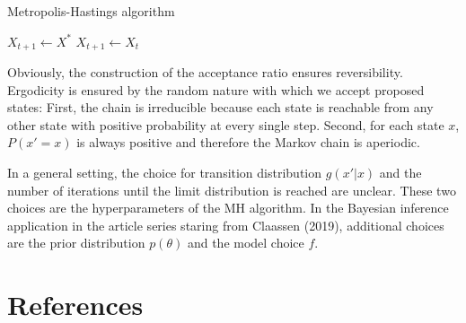 \documentclass[12pt,english,a4paper,oneside]{article}
\theoremstyle{definition}
\theoremstyle{definition}
\theoremstyle{definition}
\theoremstyle{definition}
\theoremstyle{remark}
\begin{document}
\begin{algorithm}[H]
\caption{Metropolis-Hastings algorithm}
\begin{algorithmic}

              \State $X_{t+1} \gets X^*$
          \Else
              \State $X_{t+1} \gets X_t$
\EndIf 
        \EndFor   
\end{algorithmic}
\end{algorithm}

\noindent
Obviously, the construction of the acceptance ratio ensures reversibility. Ergodicity is ensured by the random nature with which we accept proposed states: First, the chain is irreducible because each state is reachable from any other state with positive probability at every single step. Second, for each state \(x\), \(P(x'=x)\) is always positive and therefore the Markov chain is aperiodic.

In a general setting, the choice for transition distribution \(g(x'|x)\) and the number of iterations until the limit distribution is reached are unclear. These two choices are the hyperparameters of the MH algorithm. In the Bayesian inference application in the article series staring from Claassen (2019), additional choices are the prior distribution \(p(\theta)\) and the model choice \(f\).

\newpage

\hypertarget{references}{%
\section*{References}\label{references}}

\singlespacing
\end{document}
